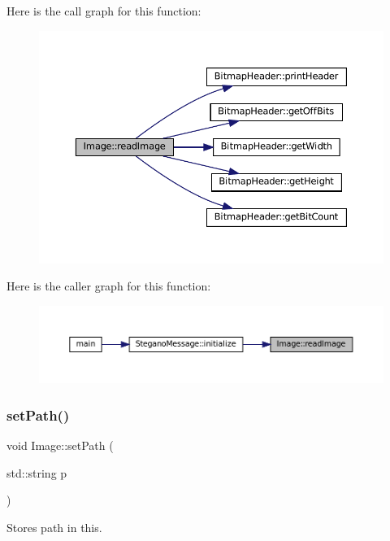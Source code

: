 Here is the call graph for this function\+:
\nopagebreak
\begin{figure}[H]
\begin{center}
\leavevmode
\includegraphics[width=350pt]{classImage_ac0aa1f41cb368d87b20dd38839218d93_cgraph}
\end{center}
\end{figure}
Here is the caller graph for this function\+:
\nopagebreak
\begin{figure}[H]
\begin{center}
\leavevmode
\includegraphics[width=350pt]{classImage_ac0aa1f41cb368d87b20dd38839218d93_icgraph}
\end{center}
\end{figure}
\mbox{\label{classImage_aabb8cec47c25c0e3a36ba2a455c2aa6c}} 
\subsubsection{\texorpdfstring{setPath()}{setPath()}}
{\footnotesize\ttfamily void Image\+::set\+Path (\begin{DoxyParamCaption}\item[{std\+::string}]{p }\end{DoxyParamCaption})}



Stores path in this. 


